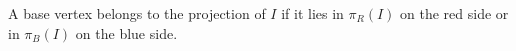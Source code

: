 \begin{definition}
A base vertex belongs to the projection of \(I\) if it lies in \(\pi_R(I)\) on
the red side or in \(\pi_B(I)\) on the blue side.
\end{definition}
